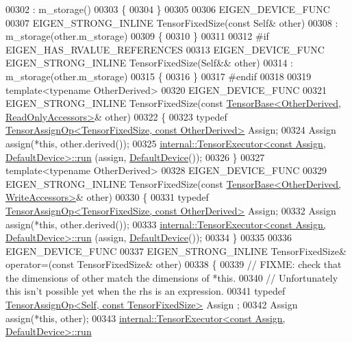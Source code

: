 \begin{DoxyCode}
00302       : m\_storage()
00303     \{
00304     \}
00305 
00306     EIGEN\_DEVICE\_FUNC
00307     EIGEN\_STRONG\_INLINE TensorFixedSize(\textcolor{keyword}{const} Self& other)
00308       : m\_storage(other.m\_storage)
00309     \{
00310     \}
00311 
00312 \textcolor{preprocessor}{#if EIGEN\_HAS\_RVALUE\_REFERENCES}
00313     EIGEN\_DEVICE\_FUNC EIGEN\_STRONG\_INLINE TensorFixedSize(Self&& other)
00314       : m\_storage(other.m\_storage)
00315     \{
00316     \}
00317 \textcolor{preprocessor}{#endif}
00318 
00319     \textcolor{keyword}{template}<\textcolor{keyword}{typename} OtherDerived>
00320     EIGEN\_DEVICE\_FUNC
00321     EIGEN\_STRONG\_INLINE TensorFixedSize(\textcolor{keyword}{const} 
      \hyperlink{class_eigen_1_1_tensor_base}{TensorBase<OtherDerived, ReadOnlyAccessors>}& other)
00322     \{
00323       \textcolor{keyword}{typedef} \hyperlink{class_eigen_1_1_tensor_assign_op}{TensorAssignOp<TensorFixedSize, const OtherDerived>}
       Assign;
00324       Assign assign(*\textcolor{keyword}{this}, other.derived());
00325       \hyperlink{class_eigen_1_1internal_1_1_tensor_executor}{internal::TensorExecutor<const Assign, DefaultDevice>::run}
      (assign, \hyperlink{struct_eigen_1_1_default_device}{DefaultDevice}());
00326     \}
00327     \textcolor{keyword}{template}<\textcolor{keyword}{typename} OtherDerived>
00328     EIGEN\_DEVICE\_FUNC
00329     EIGEN\_STRONG\_INLINE TensorFixedSize(\textcolor{keyword}{const} 
      \hyperlink{class_eigen_1_1_tensor_base}{TensorBase<OtherDerived, WriteAccessors>}& other)
00330     \{
00331       \textcolor{keyword}{typedef} \hyperlink{class_eigen_1_1_tensor_assign_op}{TensorAssignOp<TensorFixedSize, const OtherDerived>}
       Assign;
00332       Assign assign(*\textcolor{keyword}{this}, other.derived());
00333       \hyperlink{class_eigen_1_1internal_1_1_tensor_executor}{internal::TensorExecutor<const Assign, DefaultDevice>::run}
      (assign, \hyperlink{struct_eigen_1_1_default_device}{DefaultDevice}());
00334     \}
00335 
00336     EIGEN\_DEVICE\_FUNC
00337     EIGEN\_STRONG\_INLINE TensorFixedSize& operator=(\textcolor{keyword}{const} TensorFixedSize& other)
00338     \{
00339       \textcolor{comment}{// FIXME: check that the dimensions of other match the dimensions of *this.}
00340       \textcolor{comment}{// Unfortunately this isn't possible yet when the rhs is an expression.}
00341       \textcolor{keyword}{typedef} \hyperlink{class_eigen_1_1_tensor_assign_op}{TensorAssignOp<Self, const TensorFixedSize>} Assign
      ;
00342       Assign assign(*\textcolor{keyword}{this}, other);
00343       \hyperlink{class_eigen_1_1internal_1_1_tensor_executor}{internal::TensorExecutor<const Assign, DefaultDevice>::run}

\end{DoxyCode}
